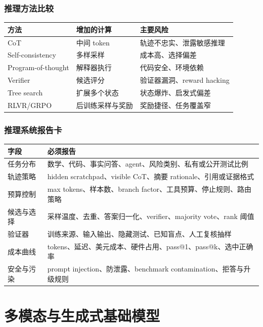 \documentclass[UTF8,zihao=-4,openany]{ctexbook}
\begin{document}
\subsection{推理方法比较}
\begin{center}
\begin{tabular}{p{}p{}p{}}
\toprule
方法 & 增加的计算 & 主要风险 \\
\midrule
CoT & 中间 token & 轨迹不忠实、泄露敏感推理 \\
Self-consistency & 多样采样 & 成本高、选择偏差 \\
Program-of-thought & 解释器执行 & 代码安全、环境依赖 \\
Verifier & 候选评分 & 验证器漏洞、reward hacking \\
Tree search & 扩展多个状态 & 状态爆炸、启发式偏差 \\
RLVR/GRPO & 后训练采样与奖励 & 奖励捷径、任务覆盖窄 \\
\bottomrule
\end{tabular}
\end{center}

\subsection{推理系统报告卡}
\begin{center}
\begin{tabular}{p{}p{}}
\toprule
字段 & 必须报告 \\
\midrule
任务分布 & 数学、代码、事实问答、agent、风险类别、私有或公开测试比例 \\
轨迹策略 & hidden scratchpad、visible CoT、摘要 rationale、引用或证据格式 \\
预算控制 & max tokens、样本数、branch factor、工具预算、停止规则、路由策略 \\
候选与选择 & 采样温度、去重、答案归一化、verifier、majority vote、rank 阈值 \\
验证器 & 训练来源、输入输出、隐藏测试、已知盲点、人工复核抽样 \\
成本曲线 & tokens、延迟、美元成本、硬件占用、pass@1、pass@k、选中正确率 \\
安全与污染 & prompt injection、防泄露、benchmark contamination、拒答与升级规则 \\
\bottomrule
\end{tabular}
\end{center}

\chapter{多模态与生成式基础模型}
\end{document}
